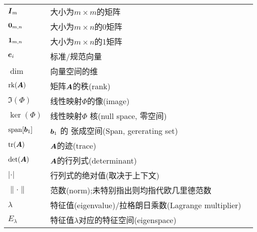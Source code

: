 \begin{table}
\begin{tabular}{llp{\textwidth}}
    \hline
    $\boldsymbol{I}_m$ & 大小为$m \times m$的矩阵 \\
    $\boldsymbol{0}_{m,n}$ & 大小为$m \times n$的0矩阵 \\
    $\boldsymbol{1}_{m,n}$ & 大小为$m \times n$的1矩阵 \\
    $\boldsymbol{e}_i$ & 标准/规范向量 \\
    $\dim$ & 向量空间的维 \\
    $\mathrm{rk}(\boldsymbol{A})$ & 矩阵$\boldsymbol{A}$的秩(rank) \\
    $\Im(\Phi)$ & 线性映射$\Phi$的像(image) \\
    $\ker(\Phi)$ & 线性映射$\Phi$ 核(null space, 零空间) \\
    $\mathrm{span}[\boldsymbol{b}_1]$ & $\boldsymbol{b}_1$ 的 张成空间(Span, gererating set) \\
    $\mathrm{tr}(\boldsymbol{A})$ & $\boldsymbol{A}$的迹(trace) \\
    $\det(\boldsymbol{A})$ & $\boldsymbol{A}$的行列式(determinant) \\
    $|\cdot|$ & 行列式的绝对值(取决于上下文) \\
    $\| \cdot \|$ & 范数(norm);未特别指出则均指代欧几里德范数 \\
    $\lambda$ & 特征值(eigenvalue)/拉格朗日乘数(Lagrange multiplier) \\
    $E_\lambda$ & 特征值$\lambda$对应的特征空间(eigenspace) \\
    \hline
\end{tabular}
\end{table}

